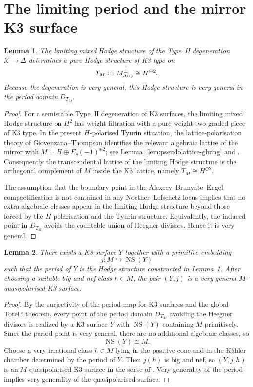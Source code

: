 \documentclass[11pt]{amsart}
\newtheorem{lemma}{Lemma}
\theoremstyle{definition}
\DeclareMathOperator{\NS}{NS}
\newcommand{\cX}{\mathcal X}
\begin{document}
\section{The limiting period and the mirror K3 surface}

\begin{lemma}\label{lem:limit-period}
The limiting mixed Hodge structure of the Type~II degeneration $\cX\to\Delta$ determines a pure Hodge structure of K3 type on
\[
T_M:=M^\perp_{\Lambda_{\K3}}\cong H^{\oplus 2}.
\]
Because the degeneration is very general, this Hodge structure is very general in the period domain $D_{T_M}$.
\end{lemma}

\begin{proof}
For a semistable Type~II degeneration of K3 surfaces, the limiting mixed Hodge structure on $H^2$ has weight filtration with a pure weight-two graded piece of K3 type. In the present $H$-polarised Tyurin situation, the lattice-polarisation theory of Giovenzana--Thompson identifies the relevant algebraic lattice of the mirror with $M=H\oplus E_8(-1)^{\oplus 2}$; see Lemma~\ref{lem:pseudolattice-gluing} and \cite[Theorems~3.26, 3.28]{GT24}. Consequently the transcendental lattice of the limiting Hodge structure is the orthogonal complement of $M$ inside the K3 lattice, namely $T_M\cong H^{\oplus 2}$.

The assumption that the boundary point in the Alexeev--Brunyate--Engel compactification is not contained in any Noether--Lefschetz locus implies that no extra algebraic classes appear in the limiting Hodge structure beyond those forced by the $H$-polarisation and the Tyurin structure. Equivalently, the induced point in $D_{T_M}$ avoids the countable union of Heegner divisors. Hence it is very general.
\end{proof}

\begin{lemma}\label{lem:existence-Y}
There exists a K3 surface $Y$ together with a primitive embedding
\[
j\colon M\hookrightarrow \NS(Y)
\]
such that the period of $Y$ is the Hodge structure constructed in Lemma~\ref{lem:limit-period}. After choosing a suitable big and nef class $h\in M$, the pair $(Y,j)$ is a very general $M$-quasipolarised K3 surface.
\end{lemma}

\begin{proof}
By the surjectivity of the period map for K3 surfaces and the global Torelli theorem, every point of the period domain $D_{T_M}$ avoiding the Heegner divisors is realized by a K3 surface $Y$ with $\NS(Y)$ containing $M$ primitively. Since the period point is very general, there are no additional algebraic classes, so
\[
\NS(Y)\cong M.
\]
Choose a very irrational class $h\in M$ lying in the positive cone and in the Kähler chamber determined by the period of $Y$. Then $j(h)$ is big and nef, so $(Y,j,h)$ is an $M$-quasipolarised K3 surface in the sense of \cite[Definition~4.2]{GT24}. Very generality of the period implies very generality of the quasipolarised surface.
\end{proof}
\end{document}
